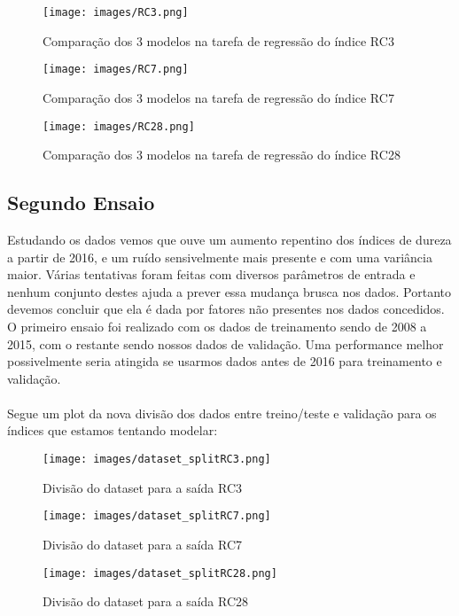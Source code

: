 \documentclass[a4paper]{article}
\begin{document}
\begin{figure}[H]
\centering
\texttt{[image: images/RC3.png]}
\caption{Comparação dos 3 modelos na tarefa de regressão do índice RC3}
\end{figure}

\begin{figure}[H]
\centering
\texttt{[image: images/RC7.png]}
\caption{Comparação dos 3 modelos na tarefa de regressão do índice RC7}
\end{figure}

\begin{figure}[H]
\centering
\texttt{[image: images/RC28.png]}
\caption{Comparação dos 3 modelos na tarefa de regressão do índice RC28}
\end{figure}


\subsection{Segundo Ensaio}

Estudando os dados vemos que ouve um aumento repentino dos índices de dureza a partir de 2016, e um ruído sensivelmente mais presente e com uma variância maior. Várias tentativas foram feitas com diversos parâmetros de entrada e nenhum conjunto destes ajuda a prever essa mudança brusca nos dados. Portanto devemos concluir que ela é dada por fatores não presentes nos dados concedidos. O primeiro ensaio foi realizado com os dados de treinamento sendo de 2008 a 2015, com o restante sendo nossos dados de validação. Uma performance melhor possivelmente seria atingida se usarmos dados antes de 2016 para treinamento e validação.
\\
\\


Segue um plot da nova divisão dos dados entre treino/teste e validação para os índices que estamos tentando modelar:

\begin{figure}[H]
\centering
\texttt{[image: images/dataset\_splitRC3.png]}
\caption{Divisão do dataset para a saída RC3}
\end{figure}

\begin{figure}[H]
\centering
\texttt{[image: images/dataset\_splitRC7.png]}
\caption{Divisão do dataset para a saída RC7}
\end{figure}

\begin{figure}[H]
\centering
\texttt{[image: images/dataset\_splitRC28.png]}
\caption{Divisão do dataset para a saída RC28}
\end{figure}
\end{document}
